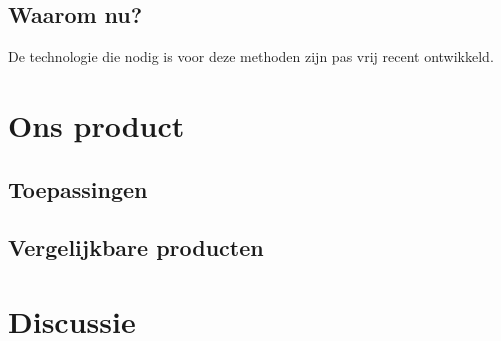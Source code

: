 \documentclass[oneside, a4paper, openany]{memoir}
\begin{document}
\section{Waarom nu?}
De technologie die nodig is voor deze methoden zijn pas vrij recent ontwikkeld.


\chapter{Ons product}
\section{Toepassingen}
\section{Vergelijkbare producten}

\chapter{Discussie}


\backmatter
\printbibliography



\end{document}
